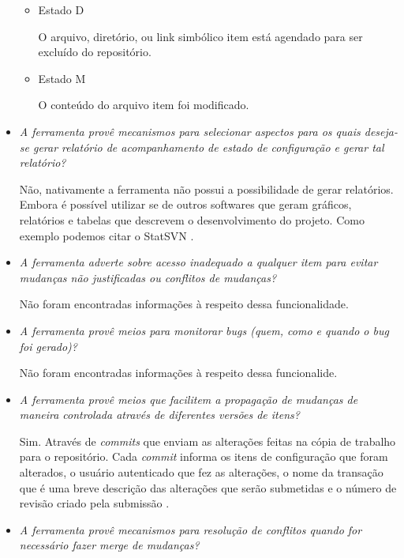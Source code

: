 \begin{itemize}
\begin{itemize}
          \item Estado D

          O arquivo, diretório, ou link simbólico item está agendado para ser excluído do repositório.

          \item Estado M

          O conteúdo do arquivo item foi modificado.
        \end{itemize}

  \item \textit{A ferramenta provê mecanismos para selecionar aspectos para os quais deseja-se gerar relatório
  de acompanhamento de estado de configuração e gerar tal relatório?}

      Não, nativamente a ferramenta não possui a possibilidade de gerar relatórios. Embora é possível utilizar se de outros softwares que geram gráficos, relatórios e tabelas que descrevem o desenvolvimento do projeto. Como exemplo podemos citar o StatSVN \footnotemark. 

  \item \textit{A ferramenta adverte sobre acesso inadequado a qualquer item para evitar mudanças não justificadas
  ou conflitos de mudanças?}
  
  Não foram encontradas informações à respeito dessa funcionalidade.
  
  \item \textit{A ferramenta provê meios para monitorar bugs (quem, como e quando o bug foi gerado)?}
  
  Não foram encontradas informações à respeito dessa funcionalide.
  
  \item \textit{A ferramenta provê meios que facilitem a propagação de mudanças de maneira controlada
  através de diferentes versões de itens?}
  
  Sim. Através de \textit{commits} que enviam as alterações feitas na cópia de trabalho para o repositório. Cada \textit{commit} 
  informa os itens de configuração que foram alterados, o usuário autenticado que fez as alterações, o nome da transação que é uma breve descrição
  das alterações que serão submetidas e o número de revisão criado pela submissão \cite{svn-book}.
  
  \item \textit{A ferramenta provê mecanismos para resolução de conflitos quando for necessário fazer merge
  de mudanças?}
  

\end{itemize}
